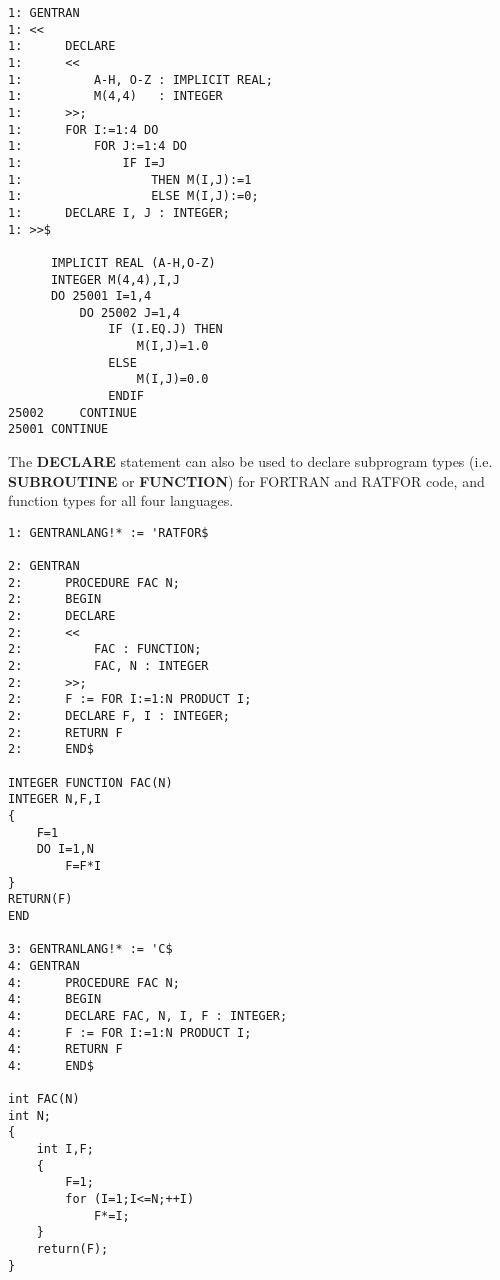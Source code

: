 \begin{describe}{\example}
\begin{verbatim}
1: GENTRAN 
1: <<
1:      DECLARE 
1:      << 
1:          A-H, O-Z : IMPLICIT REAL; 
1:          M(4,4)   : INTEGER 
1:      >>; 
1:      FOR I:=1:4 DO 
1:          FOR J:=1:4 DO 
1:              IF I=J 
1:                  THEN M(I,J):=1 
1:                  ELSE M(I,J):=0; 
1:      DECLARE I, J : INTEGER; 
1: >>$ 

      IMPLICIT REAL (A-H,O-Z)
      INTEGER M(4,4),I,J
      DO 25001 I=1,4
          DO 25002 J=1,4
              IF (I.EQ.J) THEN
                  M(I,J)=1.0
              ELSE
                  M(I,J)=0.0
              ENDIF
25002     CONTINUE
25001 CONTINUE
\end{verbatim}
\end{describe}
The {\bf DECLARE} statement can also be used to declare subprogram types (i.e.
{\bf SUBROUTINE} or {\bf FUNCTION}) for  
FORTRAN and RATFOR code, and function types for all four languages.
\begin{describe}{\example}
\begin{verbatim}
1: GENTRANLANG!* := 'RATFOR$ 

2: GENTRAN 
2:      PROCEDURE FAC N; 
2:      BEGIN 
2:      DECLARE 
2:      << 
2:          FAC : FUNCTION; 
2:          FAC, N : INTEGER 
2:      >>; 
2:      F := FOR I:=1:N PRODUCT I; 
2:      DECLARE F, I : INTEGER; 
2:      RETURN F 
2:      END$

INTEGER FUNCTION FAC(N)
INTEGER N,F,I
{
    F=1
    DO I=1,N
        F=F*I
}
RETURN(F)
END

3: GENTRANLANG!* := 'C$
4: GENTRAN 
4:      PROCEDURE FAC N; 
4:      BEGIN 
4:      DECLARE FAC, N, I, F : INTEGER; 
4:      F := FOR I:=1:N PRODUCT I; 
4:      RETURN F 
4:      END$ 

int FAC(N)
int N;
{
    int I,F;
    {
        F=1;
        for (I=1;I<=N;++I)
            F*=I;
    }
    return(F);
}
\end{verbatim}
\end{describe}

